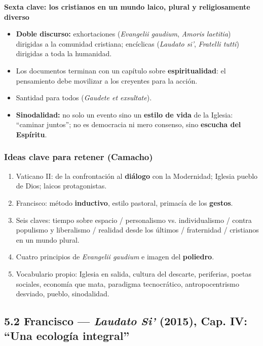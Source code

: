 \documentclass[10pt,a4paper]{article}
\begin{document}
\medskip\noindent \textbf{Sexta clave: los cristianos en un mundo laico, plural y religiosamente diverso}\par\nopagebreak
\begin{itemize}
\item \textbf{Doble discurso:} exhortaciones (\textit{Evangelii gaudium}, \textit{Amoris laetitia}) dirigidas a la comunidad cristiana; encíclicas (\textit{Laudato si'}, \textit{Fratelli tutti}) dirigidas a toda la humanidad.
\item Los documentos terminan con un capítulo sobre \textbf{espiritualidad}: el pensamiento debe movilizar a los creyentes para la acción.
\item Santidad para todos (\textit{Gaudete et exsultate}).
\item \textbf{Sinodalidad:} no solo un evento sino un \textbf{estilo de vida} de la Iglesia: ``caminar juntos''; no es democracia ni mero consenso, sino \textbf{escucha del Espíritu}.
\end{itemize}

\subsubsection{Ideas clave para retener (Camacho)}
\begin{enumerate}
\item Vaticano II: de la confrontación al \textbf{diálogo} con la Modernidad; Iglesia pueblo de Dios; laicos protagonistas.
\item Francisco: método \textbf{inductivo}, estilo pastoral, primacía de los \textbf{gestos}.
\item Seis claves: tiempo sobre espacio / personalismo vs. individualismo / contra populismo y liberalismo / realidad desde los últimos / fraternidad / cristianos en un mundo plural.
\item Cuatro principios de \textit{Evangelii gaudium} e imagen del \textbf{poliedro}.
\item Vocabulario propio: Iglesia en salida, cultura del descarte, periferias, poetas sociales, economía que mata, paradigma tecnocrático, antropocentrismo desviado, pueblo, sinodalidad.
\end{enumerate}



\subsection{5.2 Francisco --- \textit{Laudato Si'} (2015), Cap. IV: ``Una ecología integral''}
\end{document}
